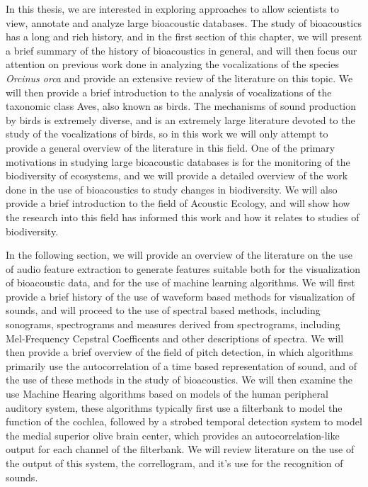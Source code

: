 \documentclass[12pt,oneside]{book}
\begin{document}

\label{chapter:relatedWork}

In this thesis, we are interested in exploring approaches to allow
scientists to view, annotate and analyze large bioacoustic databases.
The study of bioacoustics has a long and rich history, and in the
first section of this chapter, we will present a brief summary of the
history of bioacoustics in general, and will then focus our attention
on previous work done in analyzing the vocalizations of the species
\textit{Orcinus orca} and provide an extensive review of the
literature on this topic.  We will then provide a brief introduction
to the analysis of vocalizations of the taxonomic class Aves, also
known as birds.  The mechanisms of sound production by birds is
extremely diverse, and is an extremely large literature devoted to the
study of the vocalizations of birds, so in this work we will only
attempt to provide a general overview of the literature in this field.
One of the primary motivations in studying large bioacoustic databases
is for the monitoring of the biodiversity of ecosystems, and we will
provide a detailed overview of the work done in the use of
bioacoustics to study changes in biodiversity.  We will also provide a
brief introduction to the field of Acoustic Ecology, and will show how
the research into this field has informed this work and how it relates
to studies of biodiversity.

In the following section, we will provide an overview of the
literature on the use of audio feature extraction to generate features
suitable both for the visualization of bioacoustic data, and for the
use of machine learning algorithms.  We will first provide a brief
history of the use of waveform based methods for visualization of
sounds, and will proceed to the use of spectral based methods,
including sonograms, spectrograms and measures derived from
spectrograms, including Mel-Frequency Cepstral Coefficents and other
descriptions of spectra.  We will then provide a brief overview of the
field of pitch detection, in which algorithms primarily use the
autocorrelation of a time based representation of sound, and of the
use of these methods in the study of bioacoustics.  We will then
examine the use Machine Hearing algorithms based on models of the
human peripheral auditory system, these algorithms typically first use
a filterbank to model the function of the cochlea, followed by a
strobed temporal detection system to model the medial superior olive
brain center, which provides an autocorrelation-like output for each
channel of the filterbank.  We will review literature on the use of
the output of this system, the correllogram, and it's use for the
recognition of sounds.
\end{document}
